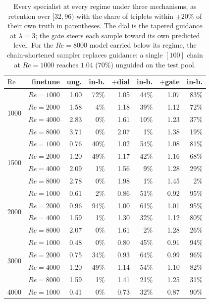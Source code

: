\begin{table}[t]
  \centering
  \caption{Every specialist at every regime under three mechanisms, as retention over $[32,96)$ with the share of triplets within $\pm20\%$ of their own truth in parentheses. The dial is the tapered guidance at $\lambda=3$; the gate steers each sample toward its own predicted level. For the $Re{=}8000$ model carried below its regime, the chain-shortened sampler replaces guidance: a single $[100]$ chain at $Re{=}1000$ reaches $1.04$ ($70\%$) unguided on the test pool.}
  \label{tab:specialist-transfer-full}
  \begin{tabular}{lrrrrrrr}
    \toprule
    $\mathrm{Re}$ & finetune & ung. & in-b. & $+$dial & in-b. & $+$gate & in-b. \\
    \midrule
    \multirow{4}{*}{1000} & $Re{=}1000$ & 1.00 & 72\% & 1.05 & 44\% & 1.07 & 83\% \\
     & $Re{=}2000$ & 1.58 & 4\% & 1.18 & 39\% & 1.12 & 72\% \\
     & $Re{=}4000$ & 2.83 & 0\% & 1.61 & 10\% & 1.23 & 37\% \\
     & $Re{=}8000$ & 3.71 & 0\% & 2.07 & 1\% & 1.38 & 19\% \\
    \midrule
    \multirow{4}{*}{1500} & $Re{=}1000$ & 0.76 & 40\% & 1.02 & 54\% & 1.08 & 81\% \\
     & $Re{=}2000$ & 1.20 & 49\% & 1.17 & 42\% & 1.16 & 68\% \\
     & $Re{=}4000$ & 2.09 & 1\% & 1.56 & 9\% & 1.28 & 29\% \\
     & $Re{=}8000$ & 2.78 & 0\% & 1.98 & 1\% & 1.45 & 2\% \\
    \midrule
    \multirow{4}{*}{2000} & $Re{=}1000$ & 0.61 & 2\% & 0.86 & 51\% & 0.92 & 95\% \\
     & $Re{=}2000$ & 0.96 & 94\% & 1.00 & 61\% & 1.01 & 95\% \\
     & $Re{=}4000$ & 1.59 & 1\% & 1.30 & 32\% & 1.12 & 80\% \\
     & $Re{=}8000$ & 2.07 & 0\% & 1.61 & 2\% & 1.28 & 26\% \\
    \midrule
    \multirow{4}{*}{3000} & $Re{=}1000$ & 0.48 & 0\% & 0.80 & 45\% & 0.91 & 94\% \\
     & $Re{=}2000$ & 0.75 & 34\% & 0.93 & 64\% & 0.99 & 96\% \\
     & $Re{=}4000$ & 1.20 & 49\% & 1.14 & 54\% & 1.10 & 82\% \\
     & $Re{=}8000$ & 1.59 & 1\% & 1.41 & 21\% & 1.25 & 31\% \\
    \midrule
    \multirow{4}{*}{4000} & $Re{=}1000$ & 0.41 & 0\% & 0.73 & 32\% & 0.87 & 90\% \\

\end{tabular}
\end{table}
